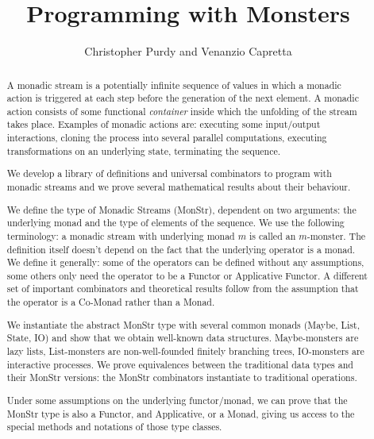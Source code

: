 \documentclass{article}
\title{Programming with Monsters}
\author{Christopher Purdy and Venanzio Capretta}
\begin{document}


\maketitle

\begin{abstract}
A monadic stream is a potentially infinite sequence of values in which a monadic action is triggered at each step before the generation of the next element.
A monadic action consists of some functional {\em container} inside which the unfolding of the stream takes place.
Examples of monadic actions are: executing some input/output interactions, cloning the process into several parallel computations, executing transformations on an underlying state, terminating the sequence.

We develop a library of definitions and universal combinators to program with monadic streams and we prove several mathematical results about their behaviour.

We define the type of Monadic Streams (MonStr), dependent on two arguments: the underlying monad and the type of elements of the sequence.
We use the following terminology: a monadic stream with underlying monad $m$ is called an $m$-monster.
The definition itself doesn't depend on the fact that the underlying operator is a monad.
We define it generally: some of the operators can be defined without any assumptions, some others only need the operator to be a Functor or Applicative Functor.
A different set of important combinators and theoretical results follow from the assumption that the operator is a Co-Monad rather than a Monad.

We instantiate the abstract MonStr type with several common monads (Maybe, List, State, IO) and show that we obtain well-known data structures.
Maybe-monsters are lazy lists, List-monsters are non-well-founded finitely branching trees, IO-monsters are interactive processes.
We prove equivalences between the traditional data types and their MonStr versions: the MonStr combinators instantiate to traditional operations.

Under some assumptions on the underlying functor/monad, we can prove that the MonStr type is also a Functor, and Applicative, or a Monad, giving us access to the special methods and notations of those type classes.
\end{abstract}
















\end{document}
